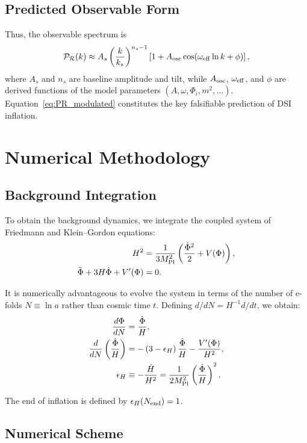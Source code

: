 \documentclass[reprint, amsmath, amssymb, aps, prd, nofootinbib]{revtex4-2}
\begin{document}
\subsection{Predicted Observable Form}

Thus, the observable spectrum is
\begin{equation}
\mathcal{P}_\mathcal{R}(k) \approx A_s
\left(\frac{k}{k_*}\right)^{n_s-1}
\left[ 1 + A_{\rm osc}\cos(\omega_{\rm eff}\ln k + \phi)\right],
\label{eq:PR_modulated}
\end{equation}
where $A_s$ and $n_s$ are baseline amplitude and tilt, while $A_{\rm osc}$,
$\omega_{\rm eff}$, and $\phi$ are derived functions of the model parameters
$(A,\omega,\Phi_i,m^2,\dots)$. Equation~\eqref{eq:PR_modulated} constitutes
the key falsifiable prediction of DSI inflation.

\section{Numerical Methodology}

\subsection{Background Integration}

To obtain the background dynamics, we integrate the coupled system of Friedmann and Klein--Gordon equations:
\begin{align}
H^2 &= \frac{1}{3 M_{\rm Pl}^2}\left(\frac{\dot{\Phi}^2}{2}+V(\Phi)\right), \\
\ddot{\Phi} + 3H \dot{\Phi} + V'(\Phi) &= 0.
\end{align}

It is numerically advantageous to evolve the system in terms of the number of e-folds $N \equiv \ln a$ rather than cosmic time $t$. Defining $d/dN = H^{-1} d/dt$, we obtain:
\begin{align}
\frac{d\Phi}{dN} &= \frac{\dot\Phi}{H}, \\
\frac{d}{dN}\left(\frac{\dot\Phi}{H}\right) &= -\left(3 - \epsilon_H\right)\frac{\dot\Phi}{H} - \frac{V'(\Phi)}{H^2}, \\
\epsilon_H &\equiv -\frac{\dot H}{H^2} = \frac{1}{2M_{\rm Pl}^2}\left(\frac{\dot\Phi}{H}\right)^2.
\end{align}

The end of inflation is defined by $\epsilon_H(N_{\rm end}) = 1$.

\subsection{Numerical Scheme}
\end{document}
